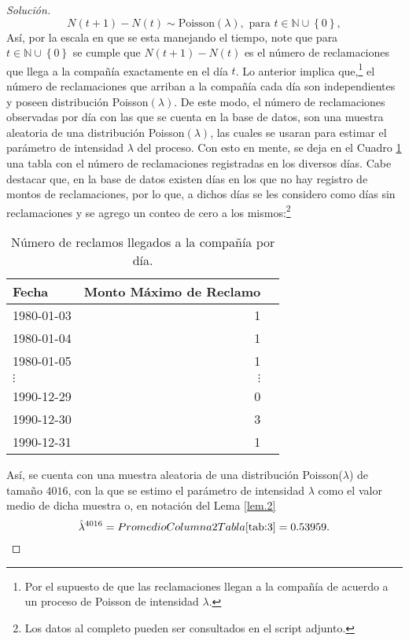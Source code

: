 \documentclass[10.5pt,notitlepage]{article}
\newenvironment{solucion}
  {\begin{proof}[Solución]}
  {\end{proof}}
\newcommand{\NN}{\mathbb{N}}
\newcommand{\kis}[1]{\left\{ #1 \right\}}
\theoremstyle{plain}
\begin{document}
\begin{solucion}
\[
N(t + 1) - N(t) \sim \text{Poisson}(\lambda), \text{ para } t \in \NN \cup\kis{0},
\]
Así, por la escala en que se esta manejando el tiempo, note que para \(t\in \NN \cup \kis{0}\) se cumple que \(N(t+1) - N(t)\) es el número de reclamaciones que llega a la compañía exactamente en el día \(t\). Lo anterior implica que,\footnote{Por el supuesto de que las reclamaciones llegan a la compañía de acuerdo a un proceso de Poisson de intensidad \(\lambda\).} el número de reclamaciones que arriban a la compañía cada día son independientes y poseen distribución Poisson\((\lambda)\). De este modo, el número de reclamaciones observadas por día con las que se cuenta en la base de datos, son una muestra aleatoria de una distribución Poisson\((\lambda )\), las cuales se usaran para estimar el parámetro de intensidad \(\lambda\) del proceso. Con esto en mente, se deja en el Cuadro \ref{tab:3} una tabla con el número de reclamaciones registradas en los diversos días. Cabe destacar que, en la base de datos existen días en los que no hay registro de montos de reclamaciones, por lo que, a dichos días se les considero como días sin reclamaciones y se agrego un conteo de cero a los mismos:\footnote{Los datos al completo pueden ser consultados en el script adjunto.}
\begin{table}[H]
        \centering
        \begin{tabular}{@{}l@{\hskip 0.3in}r@{\hskip 0.3in}r@{}}
        \toprule
        Fecha &  Monto Máximo de Reclamo\\
        \midrule          
        1980-01-03&        1\\
        1980-01-04&        1\\
        1980-01-05&        1\\
      \(\vdots\)& \(\vdots\)\\
       1990-12-29&        0\\
       1990-12-30&        3\\
       1990-12-31&        1\\
        \end{tabular}
        \caption{Número de reclamos llegados a la compañía por día.}
        \label{tab:3}
\end{table}
Así, se cuenta con una muestra aleatoria de una distribución Poisson(\(\lambda\)) de tamaño \(4016\), con la que se estimo el parámetro de intensidad \(\lambda\) como el valor medio de dicha muestra o, en notación del Lema \ref{lem.2}
\begin{equation}\label{lab.int}
  \hat{\lambda}^{4016} = PromedioColumna2Tabla\ref{tab:3} = 0.53959.

\end{equation}
\end{solucion}
\end{document}
